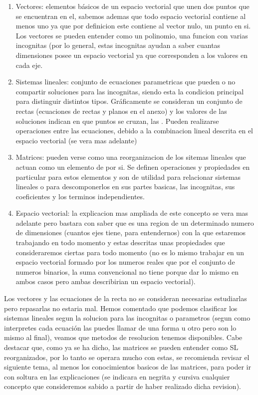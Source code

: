 \documentclass[11pt,a4paper]{article}
\begin{document}
\begin{enumerate}
\item Vectores: elementos básicos de un espacio vectorial que unen dos puntos que se encuentran en el, sabemos ademas que todo espacio vectorial contiene al menos uno ya que por definicion este contiene al vector nulo, un punto en si. Los vectores se pueden entender como un polinomio, una funcion con varias incognitas (por lo general, estas incognitas ayudan a saber cuantas dimensiones posee un espacio vectorial ya que corresponden a los valores en cada eje. 

\item Sistemas lineales: conjunto de ecuaciones parametricas que pueden o no compartir soluciones para las incognitas, siendo esta la condicion principal para distinguir distintos tipos. Gráficamente se consideran un conjunto de rectas (ecuaciones de rectas y planos en el anexo) y los valores de las soluciones indican en que puntos se cruzan, las . Pueden realizarse operaciones entre las ecuaciones, debido a la combinacion lineal descrita en el espacio vectorial (se vera mas adelante)

\item Matrices: pueden verse como una reorganizacion de los sitemas lineales que actuan como un elemento de por si. Se definen operaciones y propiedades en particular para estos elementos y son de utilidad para relacionar sistemas lineales o para descomponerlos en sus partes basicas, las incognitas, sus coeficientes y los terminos independientes.

\item Espacio vectorial: la explicacion mas ampliada de este concepto se vera mas adelante pero bastara con saber que es una region de un determinado numero de dimensiones (cuantos ejes tiene, para entendernos) con la que estaremos trabajando en todo momento y estas descritas unas propiedades que consideraremos ciertas para todo momento (no es lo mismo trabajar en un espacio vectorial formado por los numeros reales que por el conjunto de numeros binarios, la suma convencional no tiene porque dar lo mismo en ambos casos pero ambas describirian un espacio vectorial).
\end{enumerate}

Los vectores y las ecuaciones de la recta no se consideran necesarias estudiarlas pero repasarlas no estaria mal. Hemos comentado que podemos clasificar los sistemas lineales segun la solucion para las incognitas o parametros (segun como interpretes cada ecuación las puedes llamar de una forma u otro pero son lo mismo al final), veamos que metodos de resolucion tenemos disponibles. Cabe destacar que, como ya se ha dicho, las matrices se pueden entender como SL reorganizados, por lo tanto se operara mucho con estas, se recomienda revisar el siguiente tema, al menos los conocimientos basicos de las matrices, para poder ir con soltura en las explicaciones (se indicara en negrita y cursiva cualquier concepto que consideremos sabido a partir de haber realizado dicha revision).
\end{document}
